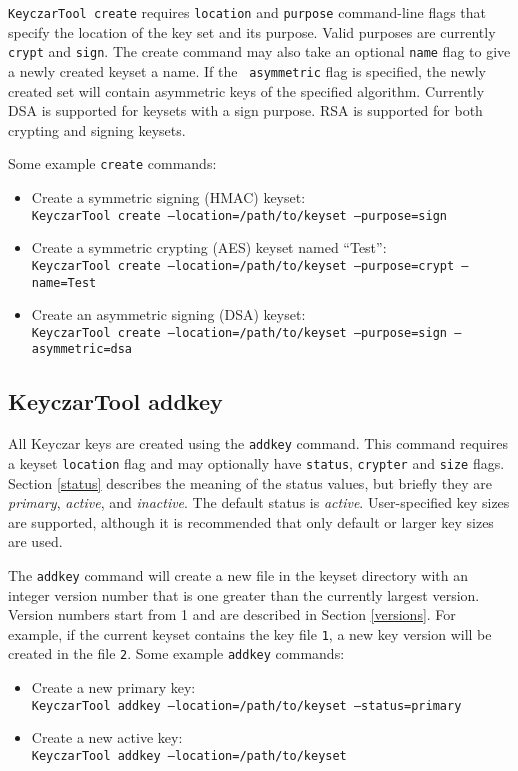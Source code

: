 \documentclass{llncs}
\begin{document}
{\tt KeyczarTool create} requires {\tt location} and {\tt purpose} command-line
flags that specify the location of the key set and its purpose. Valid purposes
are currently {\tt crypt} and {\tt sign}. The create command may also take
an optional {\tt name} flag to give a newly created keyset a name. If the {\tt
asymmetric} flag is specified, the newly created set will contain asymmetric
keys of the specified algorithm. Currently DSA is supported for keysets with
a sign purpose. RSA is supported for both crypting and signing keysets.

Some example {\tt create} commands:
\begin{itemize}
\item Create a symmetric signing (HMAC) keyset: \\
{\tt KeyczarTool create --location=/path/to/keyset --purpose=sign}
\item Create a symmetric crypting (AES) keyset named ``Test'': \\
{\tt KeyczarTool create --location=/path/to/keyset --purpose=crypt --name=Test}
\item Create an asymmetric signing (DSA) keyset: \\
{\tt KeyczarTool create --location=/path/to/keyset --purpose=sign
--asymmetric=dsa}
\end{itemize}

\subsection{KeyczarTool addkey}

All Keyczar keys are created using the {\tt addkey} command. This command
requires a keyset {\tt location} flag and may optionally have {\tt status},
{\tt crypter} and {\tt size} flags. Section \ref{status} describes the meaning
of the status values, but briefly they are {\it primary}, {\it active}, and {\it
inactive}. The default status is {\it active}. User-specified
key sizes are supported, although it is recommended that only default or larger
key sizes are used.

The {\tt addkey} command will create a new file in the keyset directory with an
integer version number that is one greater than the currently largest version.
Version numbers start from 1 and are described in Section \ref{versions}. For
example, if the current keyset contains the key file {\tt 1}, a new key version
will be created in the file {\tt 2}. Some example {\tt addkey} commands:
\begin{itemize}
\item Create a new primary key: \\
{\tt KeyczarTool addkey --location=/path/to/keyset --status=primary}
\item Create a new active key: \\
{\tt KeyczarTool addkey --location=/path/to/keyset} 
\end{itemize}
\end{document}

